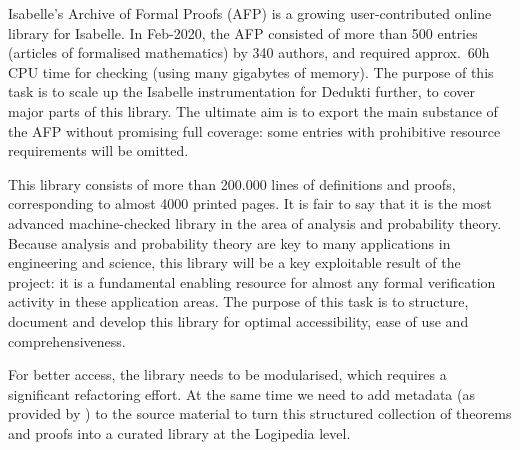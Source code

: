 \begin{workpackage}[id=libraries,type=RTD,wphases=1-48,
  short={Large libraries},%
  title={Large libraries},
  activity=na,
  lead=Tum,
  StrRM=18,
  ChaRM=12,
  TumRM=27]
\begin{tasklist}


\begin{task}[
  id=afp,
  title=Isabelle's Archive of Formal Proofs,
  shorttitle=Isa. AFP,
  lead=Tum,
  TumRM=3,
  wphases=13-18]
  Isabelle's Archive of Formal Proofs (AFP) is a
growing user-contributed online library for Isabelle. In Feb-2020, the
AFP consisted of more than 500 entries (articles of formalised
mathematics) by 340 authors, and required approx.\ 60h CPU time for
checking (using many gigabytes of memory).  The purpose of this task
is to scale up the Isabelle instrumentation for Dedukti further, to
cover major parts of this library. The ultimate aim is to export the main
substance of the AFP without promising full coverage: some entries
with prohibitive resource requirements will be omitted.
\end{task}

\begin{task}[
  id=isaAnalysisProb,
  title=The Isabelle Analysis \& Probability Theory library,
  shorttitle=Isa. A\&P,
  lead=Tum,
  TumRM=24,
  wphases=1-24]
%
  This library consists of more than 200.000 lines
  of definitions and proofs, corresponding to almost 4000 printed
  pages. It is fair to say that it is the most advanced
  machine-checked library in the area of analysis and probability
  theory. Because analysis and probability theory are key to many
  applications in engineering and science, this library will be a key
  exploitable result of the project: it is a fundamental enabling
  resource for almost any formal verification activity in these
  application areas. The purpose of this task is to structure,
  document and develop this library for optimal accessibility, ease of
  use and comprehensiveness.

For better access, the library needs to be modularised, which requires
a significant refactoring effort.  At the same time we need to add
metadata (as provided by ) to the source material
to turn this structured collection of theorems and proofs into a
curated library at the Logipedia level.


\end{task}
\end{tasklist}
\end{workpackage}
